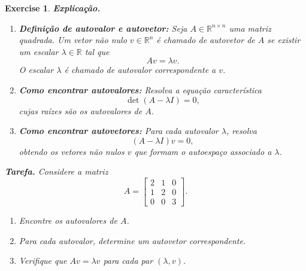 \documentclass[12pt,a4paper]{article}
\newtheorem{exercise}{Exercise}[section]
\begin{document}
\begin{exercise}
\textbf{Explicação.}

\begin{enumerate}
  \item \textbf{Definição de autovalor e autovetor:}  
  Seja $A \in \mathbb{R}^{n \times n}$ uma matriz quadrada. Um vetor não nulo $v \in \mathbb{R}^n$ é chamado de \emph{autovetor} de $A$ se existir um escalar $\lambda \in \mathbb{R}$ tal que
  \[
  Av = \lambda v.
  \]
  O escalar $\lambda$ é chamado de \emph{autovalor} correspondente a $v$.

  \item \textbf{Como encontrar autovalores:}  
  Resolva a \emph{equação característica}
  \[
  \det(A - \lambda I) = 0,
  \]
  cujas raízes são os autovalores de $A$.

  \item \textbf{Como encontrar autovetores:}  
  Para cada autovalor $\lambda$, resolva
  \[
  (A - \lambda I)v = 0,
  \]
  obtendo os vetores não nulos $v$ que formam o autoespaço associado a $\lambda$.
\end{enumerate}

\bigskip

\textbf{Tarefa.}  
Considere a matriz
\[
A = \begin{bmatrix}
2 & 1 & 0 \\
1 & 2 & 0 \\
0 & 0 & 3
\end{bmatrix}.
\]
\begin{enumerate}[label=(\alph*)]
    \item Encontre os autovalores de $A$.  
    \item Para cada autovalor, determine um autovetor correspondente.  
    \item Verifique que $Av = \lambda v$ para cada par $(\lambda, v)$.  
\end{enumerate}
\end{exercise}
\end{document}
